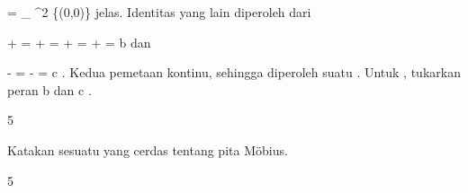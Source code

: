 {\mavergleichskettedisp
{\vergleichskette
{ \varphi \circ \psi
}
{ =} {
_{ \R^2 \setminus \{(0,0)\}  }
}
{ } {
}
{ } {
}
{ } {
}
}
{}{}{}
jelas. Identitas yang lain diperoleh dari

\mavergleichskettealign
{\vergleichskettealign
{ {  } + 
}
{ =} { {  } + {  }  
}
{ =} { {  } + {  }  
}
{ =} { {  } + {  }
}
{ =} {b
}
}
{}
{}{}
dan

\mavergleichskettedisp
{\vergleichskette
{ {  } - 
}
{ =} { {  } - {  }
}
{ =} { c
}
{ } {}
{ } {}
}
{}{}{.}
Kedua pemetaan kontinu, sehingga diperoleh suatu
.
Untuk
, tukarkan peran
\mathkor {} {b} {dan} {c} {.}

 }



{5}

{

Katakan sesuatu yang cerdas tentang pita Möbius.

}
{  }



{5}

